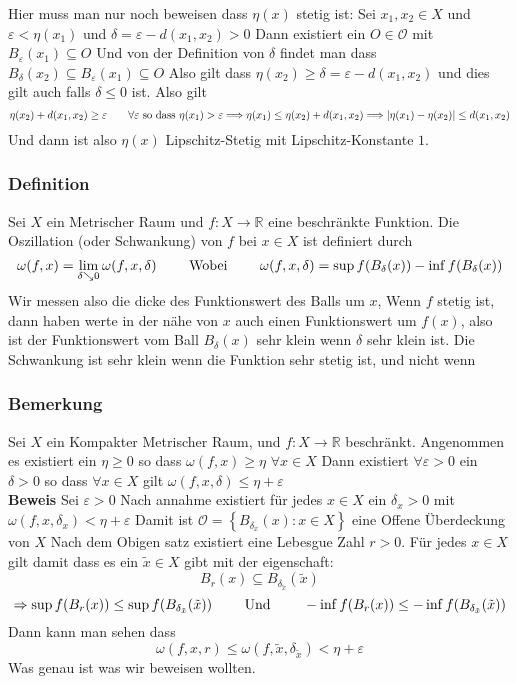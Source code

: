 \documentclass{article}
\newcommand{\mspc}{\hspace{0.7cm}}
\newcommand{\beweis}{\\\textbf{Beweis }}
\newcommand{\bemerkung}[1]{\subsubsection*{Bemerkung {#1}}}
\newcommand{\definition}[1]{\subsubsection*{Definition {#1}}}
\begin{document}
\newline Hier muss man nur noch beweisen dass $\eta(x)$ stetig ist:
\newline Sei $x_1, x_2\in X$ und $\varepsilon<\eta(x_1)$ und $\delta= \varepsilon-d(x_1, x_2)>0$ Dann existiert ein $O\in \mathcal{O}$ mit $B_{\varepsilon}(x_1)\subseteq O$ Und von der Definition von $\delta$ findet man dass $B_{\delta}(x_2)\subseteq B_{\varepsilon}(x_1)\subseteq O$ Also gilt dass $\eta(x_2)\ge \delta= \varepsilon-d(x_1, x_2)$ und dies gilt auch falls $\delta\le 0$ ist. Also gilt 
\[\eta(x_2)+d(x_1,x_2)\ge \varepsilon\mspc \forall \varepsilon \text{ so dass } \eta(x_1)> \varepsilon\Longrightarrow \eta(x_1)\le \eta(x_2)+d(x_1, x_2) \Longrightarrow |\eta(x_1)-\eta(x_2)|\le d(x_1,x_2)\]
Und dann ist also $\eta(x)$ Lipschitz-Stetig mit Lipschitz-Konstante $1$.
\definition{} Sei $X$ ein Metrischer Raum und $f:X \rightarrow \mathbb{R}$ eine beschränkte Funktion. Die Oszillation (oder Schwankung) von $f$ bei $x\in X$ ist definiert durch \[\omega (f,x)=\lim_{\delta \searrow 0}\omega(f, x, \delta) \mspc\text{   Wobei   }\mspc \omega(f,x,\delta)=\sup f(B_{\delta}(x))-\inf f(B_{\delta}(x)) \]
Wir messen also die dicke des Funktionswert des Balls um $x$, Wenn $f$ stetig ist, dann haben werte in der nähe von $x$ auch einen Funktionswert um $f(x)$, also ist der Funktionswert vom Ball $B_{\delta}(x)$ sehr klein wenn $\delta$ sehr klein ist. Die Schwankung ist sehr klein wenn die Funktion sehr stetig ist, und nicht wenn 
\bemerkung{} Sei $X$ ein Kompakter Metrischer Raum, und $f:X \rightarrow \mathbb{R}$ beschränkt. Angenommen es existiert ein $\eta \ge 0$ so dass $\omega(f,x)\ge \eta$ $\forall x \in X$ Dann existiert $\forall \varepsilon > 0$ ein $\delta >0$ so dass $\forall x\in X$ gilt $\omega(f,x,\delta)\le \eta + \varepsilon$
\beweis Sei $\varepsilon >0$  Nach annahme existiert für jedes $x\in X$ ein $\delta_x>0$ mit $\omega(f,x,\delta_x)<\eta + \varepsilon$
Damit ist $\mathcal{O}=\left\lbrace B_{\delta_x}(x):x\in X\right\rbrace$ eine Offene Überdeckung von $X$ Nach dem Obigen satz existiert eine Lebesgue Zahl $r>0$. Für jedes $x\in X$ gilt damit
dass es ein $\tilde{x}\in X$ gibt mit der eigenschaft: \[B_r(x)\subseteq B_{\delta_{\tilde{x}}}(\tilde{x})\]\[ \Rightarrow \sup f(B_r(x))\le \sup f(B_{\delta_{\tilde{x}}}(\tilde{x}))\mspc \text{ Und }\mspc -\inf f(B_r(x))\le -\inf f(B_{\delta_{\tilde{x}}}(\tilde{x}))\]
Dann kann man sehen dass \[\omega(f,x,r)\le \omega(f,\tilde{x}, \delta_{\tilde{x}})<\eta+\varepsilon\]
Was genau ist was wir beweisen wollten.
\end{document}
